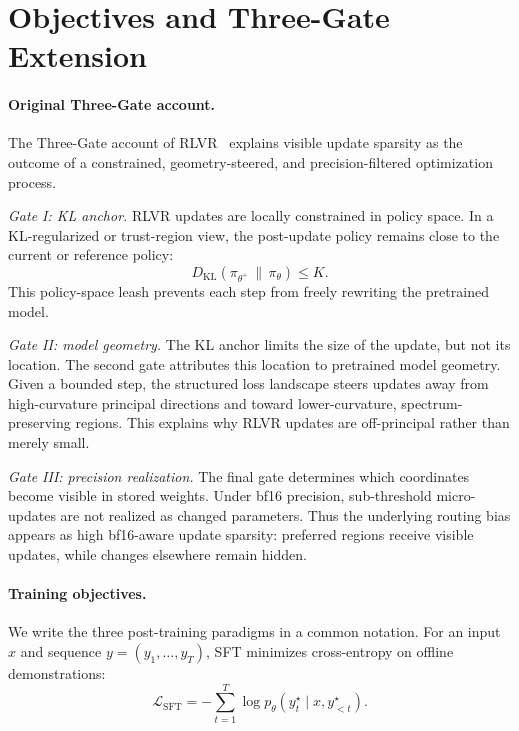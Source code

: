 \section{Objectives and Three-Gate Extension}
\label{app:three_gate_extension}

\paragraph{Original Three-Gate account.}
The Three-Gate account of RLVR~\cite{zhu2025pnt} explains visible update
sparsity as the outcome of a constrained, geometry-steered, and
precision-filtered optimization process.

\emph{Gate I: KL anchor.}
RLVR updates are locally constrained in policy space. In a KL-regularized or
trust-region view, the post-update policy remains close to the current or
reference policy:
\begin{equation}
D_{\mathrm{KL}}(\pi_{\theta^+}\,\|\,\pi_{\theta})
\leq K .
\end{equation}
This policy-space leash prevents each step from freely rewriting the
pretrained model.

\emph{Gate II: model geometry.}
The KL anchor limits the size of the update, but not its location. The second
gate attributes this location to pretrained model geometry. Given a bounded
step, the structured loss landscape steers updates away from high-curvature
principal directions and toward lower-curvature, spectrum-preserving regions.
This explains why RLVR updates are off-principal rather than merely small.

\emph{Gate III: precision realization.}
The final gate determines which coordinates become visible in stored weights.
Under bf16 precision, sub-threshold micro-updates are not realized as changed
parameters. Thus the underlying routing bias appears as high bf16-aware update
sparsity: preferred regions receive visible updates, while changes elsewhere
remain hidden.


\paragraph{Training objectives.}
We write the three post-training paradigms in a common notation. For an input
$x$ and sequence $y=(y_1,\ldots,y_T)$, SFT minimizes cross-entropy on offline
demonstrations:
\begin{equation}
\mathcal{L}_{\mathrm{SFT}}
=
-\sum_{t=1}^{T}
\log p_\theta(y_t^\star\mid x,y_{<t}^\star).
\end{equation}

